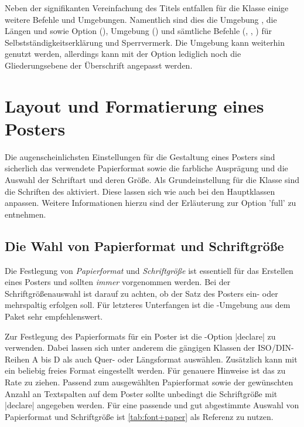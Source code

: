 \begin{Bundle*}[v2.05]{}
Neben der signifikanten Vereinfachung des Titels entfallen für die Klasse 
 einige weitere Befehle und Umgebungen. Namentlich sind 
dies die Umgebung , die Längen  
und  sowie Option (), Umgebung 
() und sämtliche Befehle (, 
, ) für Selbstständigkeitserklärung und 
Sperrvermerk. Die Umgebung  kann weiterhin genutzt 
werden, allerdings kann mit der Option  lediglich noch die 
Gliederungsebene der Überschrift angepasst werden.



\section{Layout und Formatierung eines Posters}
%
Die augenscheinlichsten Einstellungen für die Gestaltung eines Posters sind 
sicherlich das verwendete Papierformat sowie die farbliche Ausprägung und die 
Auswahl der Schriftart und deren Größe. Als Grundeinstellung für die Klasse
 sind die Schriften des \TUDCDs aktiviert. Diese lassen 
sich wie auch bei den Hauptklassen anpassen. Weitere Informationen hierzu sind 
der Erläuterung zur Option 'full' zu entnehmen. 


\subsection{Die Wahl von Papierformat und Schriftgröße}
%
%
%

Die Festlegung von \emph{Papierformat} und \emph{Schriftgröße} ist essentiell 
für das Erstellen eines Posters und sollten \emph{immer} vorgenommen werden. 
Bei der Schriftgrößenauswahl ist darauf zu achten, ob der Satz des Posters 
ein- oder mehrspaltig erfolgen soll. Für letzteres Unterfangen ist die 
-Umgebung aus dem Paket  sehr 
empfehlenswert. 

Zur Festlegung des Papierformats für ein Poster ist die \KOMAScript-Option 
|declare| zu verwenden. Dabei lassen sich unter 
anderem die gängigen Klassen der ISO/DIN-Reihen A bis D als auch Quer- oder 
Längsformat auswählen. Zusätzlich kann mit  ein beliebig 
freies Format eingestellt werden. Für genauere Hinweise ist das \scrguide zu 
Rate zu ziehen. Passend zum ausgewählten Papierformat sowie der gewünschten 
Anzahl an Textspalten auf dem Poster sollte unbedingt die Schriftgröße mit 
|declare| angegeben werden. Für eine 
passende und gut abgestimmte Auswahl von Papierformat und Schriftgröße ist 
\autoref{tab:font+paper} als Referenz zu nutzen.


\end{Bundle*}
